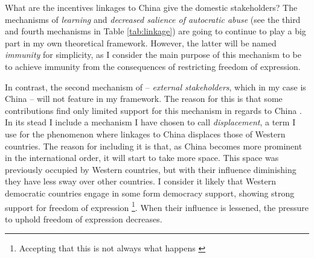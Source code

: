 What are the incentives linkages to China give the domestic stakeholders? The mechanisms of \textit{learning} and \textit{decreased salience of autocratic abuse} (see the third and fourth mechanisms in Table \ref{tab:linkage}) are going to continue to play a big part in my own theoretical framework. However, the latter will be named \textit{immunity} for simplicity, as I consider the main purpose of this mechanism to be to achieve immunity from the consequences of restricting freedom of expression.

In contrast, the second mechanism of \citeauthor{tansey_ties_2017} -- \textit{external stakeholders}, which in my case is China -- will not feature in my framework. The reason for this is that some contributions find only limited support for this mechanism in regards to China \citep{chen_democracy_2015}. In its stead I include a mechanism I have chosen to call \textit{displacement}, a term I use for the phenomenon where linkages to China displaces those of Western countries. The reason for including it is that, as China becomes more prominent in the international order, it will start to take more space. This space was previously occupied by Western countries, but with their influence diminishing they have less sway over other countries. I consider it likely that Western democratic countries engage in some form democracy support, showing strong support for freedom of expression \citep{levitsky_linkage_2006}\footnote{Accepting that this is not always what happens \citep{chen_democracy_2015, wong_chinese_2019}}. When their influence is lessened, the pressure to uphold freedom of expression decreases.

